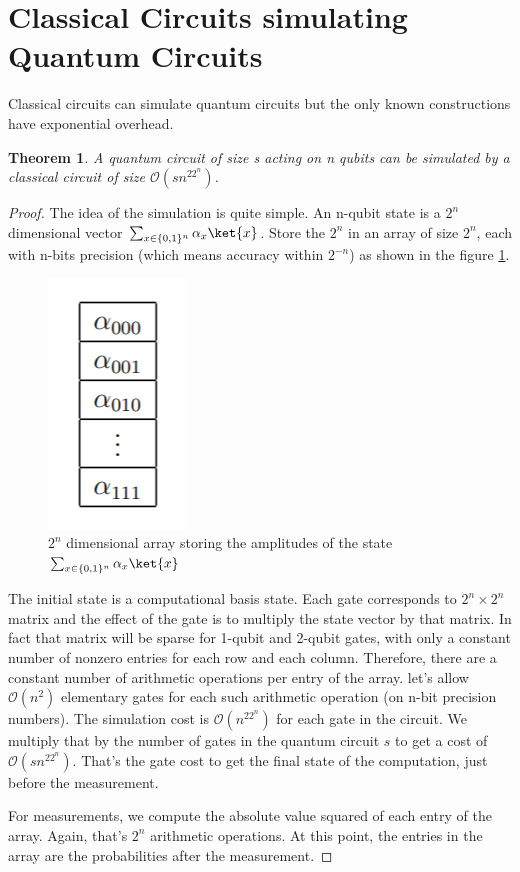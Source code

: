 \documentclass[12pt, oneside]{book}
\newtheorem{theorem}{Theorem}[section]
\theoremstyle{definition}
\theoremstyle{definition}
\theoremstyle{remark}
\begin{document}
\section{Classical Circuits simulating Quantum Circuits}
Classical circuits can simulate quantum circuits but the only known constructions have exponential overhead.
\begin{theorem}
    A quantum circuit of size s acting on n qubits can be simulated by a classical circuit of size $\mathcal{O}(sn^22^n)$.
\end{theorem}
\begin{proof}
    The idea of the simulation is quite simple. An n-qubit state is a $2^n$ dimensional vector  $\sum_{x \in \{0,1\}^n} \alpha_x\ket{x}$. Store the $2^n$ in an array of size $2^n$, each with n-bits precision (which means accuracy within $2^{-n}$) as shown in the figure \ref{fig:2ndimarray}.
    \begin{figure}[H]
        \centering
        \includegraphics[width=0.1\linewidth]{../images/2ndimarray.png}
        \caption{$2^n$ dimensional array storing the amplitudes of the state $\sum_{x\in\{0,1\}^n} \alpha_x\ket{x}$}
        \label{fig:2ndimarray}
    \end{figure}
    The initial state is a computational basis state. Each gate corresponds to $2^n\times 2^n$ matrix and the effect of the gate is to multiply the state vector by that matrix. In fact that matrix will be sparse for 1-qubit and 2-qubit gates, with only a constant number of nonzero entries for each row and each column. Therefore, there are a constant number of arithmetic operations per entry of the array. let's allow $\mathcal{O}(n^2)$ elementary gates for each such arithmetic operation (on n-bit precision numbers). The simulation cost is $\mathcal{O}(n^22^n)$ for each gate in the circuit. We multiply that by the number of gates in the quantum circuit $s$ to get a cost of $\mathcal{O}(sn^22^n)$. That's the gate cost to get the final state of the computation, just before the measurement.

    For measurements, we compute the absolute value squared of each entry of the array. Again, that's $2^n$ arithmetic operations. At this point, the entries in the array are the probabilities after the measurement.


\end{proof}
\end{document}
